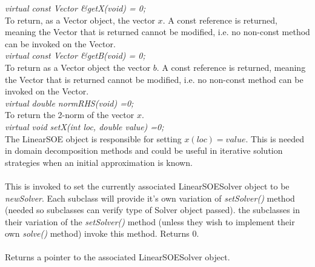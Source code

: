 {\em virtual const Vector \&getX(void) = 0;} \\
To return, as a Vector object, the vector $x$. A const reference is
returned, meaning the Vector that is returned cannot be modified, i.e.
no non-const method can be invoked on the Vector. \\

{\em virtual const Vector \&getB(void) = 0;} \\
To return as a Vector object the vector $b$. A const reference is
returned, meaning the Vector that is returned cannot be modified, i.e.
no non-const method can be invoked on the Vector. \\


{\em virtual double normRHS(void) =0;} \\
To return the 2-norm of the vector $x$. \\

{\em virtual void setX(int loc, double value) =0;}\\
The LinearSOE object is responsible for setting $x(loc) = value$. This
is needed in domain decomposition methods and could be useful in
iterative solution strategies when an initial approximation is known.\\


\\
This is invoked to set the currently associated LinearSOESolver object to 
be {\em newSolver}. Each subclass will provide it's own variation of {\em
setSolver()} method (needed so subclasses can verify type of Solver
object passed). the subclasses in their variation of the {\em setSolver()}
method (unless they wish to implement their own {\em solve()}
method) invoke this method. Returns $0$.  \\

\\
Returns a pointer to the associated LinearSOESolver object.






